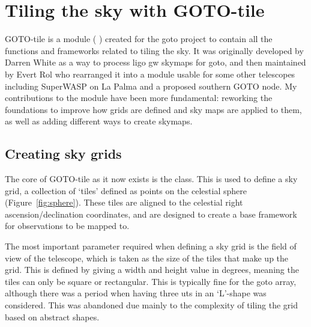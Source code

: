\section{Tiling the sky with GOTO-tile}
\label{sec:gototile}
\begin{colsection}


\begin{colsection}

GOTO-tile is a  module ( ) created for the \gls{goto} project to contain all the functions and frameworks related to tiling the sky. It was originally developed by Darren White as a way to process \gls{ligo} \gls{gw} skymaps for \gls{goto}, and then maintained by Evert Rol who rearranged it into a module usable for some other telescopes including SuperWASP on La Palma and a proposed southern GOTO node. My contributions to the module have been more fundamental: reworking the foundations to improve how grids are defined and sky maps are applied to them, as well as adding different ways to create skymaps.

\end{colsection}


\subsection{Creating sky grids}
\label{sec:grids}
\begin{colsection}

The core of GOTO-tile as it now exists is the  class. This is used to define a sky grid, a collection of `tiles' defined as points on the celestial sphere (Figure~\ref{fig:sphere}). These tiles are aligned to the celestial right ascension/declination coordinates, and are designed to create a base framework for observations to be mapped to.

The most important parameter required when defining a sky grid is the field of view of the telescope, which is taken as the size of the tiles that make up the grid. This is defined by giving a width and height value in degrees, meaning the tiles can only be square or rectangular. This is typically fine for the \gls{goto} array, although there was a period when having three \glspl{ut} in an `L'-shape was considered. This was abandoned due mainly to the complexity of tiling the grid based on abstract shapes.


\end{colsection}
\end{colsection}
